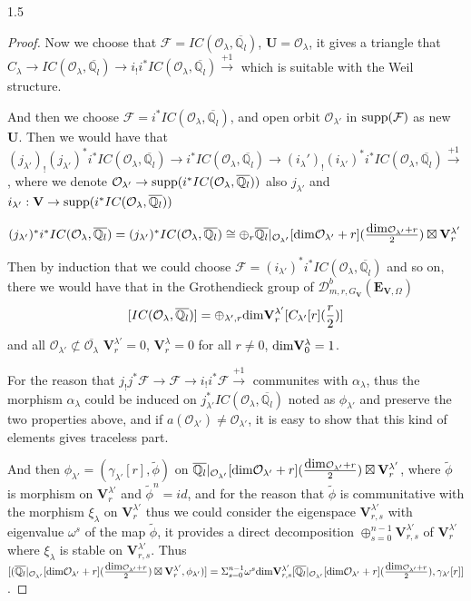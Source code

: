 \documentclass[10pt]{amsart}
\def\dim{\mbox{\rm dim}}   \def\End{\mbox{\rm End}}
\def\bfV{{\mathbf V}}
\def\supp{{\rm supp}}
\def\bfV{\mathbf{V}}
\def\bfE{\mathbf{E}}
\def\bfU{\mathbf{U}}
\newcommand\bbq{{\mathbb Q}}
\newcommand\mf{{\mathcal{F}}}
\newcommand\mo{{\mathcal{O}}}
\begin{document}
\begin{spacing}{1.5}
\begin{proof}
Now we choose that $\mf=IC(\mo_{\lambda},\overline{\bbq_l})$, $\bfU=\mo_{\lambda}$, it gives a triangle that $C_{\lambda}\rightarrow IC(\mo_{\lambda},\overline{\bbq_l})\rightarrow i_!i^*IC(\mo_{\lambda},\overline{\bbq_l})\xrightarrow{+1}$ which is suitable with the Weil structure.

And then we choose $\mf=i^*IC(\mo_{\lambda},\overline{\bbq_l})$, and open orbit $\mo_{\lambda'}$ in $\supp(\mf)$ as new $\bfU$. Then we would have that $(j_{\lambda'})_!(j_{\lambda'})^*i^*IC(\mo_{\lambda},\overline{\bbq_l})\rightarrow i^*IC(\mo_{\lambda},\overline{\bbq_l})\rightarrow (i_\lambda')_!(i_{\lambda'})^*i^*IC(\mo_{\lambda},\overline{\bbq_l})\xrightarrow{+1}$, where we denote $\mo_{\lambda'}\rightarrow \supp(i^*IC(\mo_{\lambda},\overline{\bbq_l}))$ also $j_{\lambda'}$ and $i_{\lambda'}:\bfV\rightarrow \supp(i^*IC(\mo_{\lambda},\overline{\bbq_l}))$

$(j_{\lambda'})^*i^*IC(\mo_{\lambda},\overline{\bbq_l})=(j_{\lambda'})^*IC(\mo_{\lambda},\overline{\bbq_l})\cong \oplus_r \overline{\bbq_{l}}|_{\mo_{\lambda'}}[\dim \mo_{\lambda'}+r](\frac{\dim \mo_{\lambda'}+r}{2})\boxtimes \bfV^{\lambda'}_r$

Then by induction that we could choose $\mf=(i_{\lambda'})^*i^*IC(\mo_{\lambda},\overline{\bbq_l})$ and so on, there we would have that in the Grothendieck group of $\mathcal{D}^{b}_{m,r,G_{\bfV}}(\bfE_{\bfV,\Omega})$  
$$[IC(\mo_{\lambda},\overline{\bbq_l})]=\oplus_{\lambda',r} \dim \bfV^{\lambda'}_r[C_{\lambda'}[r](\frac{r}{2})]$$ and all $\mo_{\lambda'}\not\subset \overline{\mo_{\lambda}}$ $\bfV^{\lambda'}_r=0$, $\bfV^{\lambda}_r=0$ for all $r\not=0$, $\dim \bfV_0^{\lambda}=1$.


For the reason that $j_!j^*\mf\rightarrow \mf \rightarrow i_!i^*\mf\xrightarrow{+1}$ communites with $\alpha_{\lambda}$, thus the morphism $\alpha_{\lambda}$ could be induced on $j_{\lambda'}^*IC(\mo_{\lambda},\overline{\bbq_l})$ noted as $\phi_{\lambda'}$ and preserve the two properties above, and if $a(\mo_{\lambda'})\not=\mo_{\lambda'}$, it is easy to show that this kind of elements gives traceless part.

And then $\phi_{\lambda'}=(\gamma_{\lambda'}[r],\tilde{\phi})$ on $\overline{\bbq_{l}}|_{\mo_{\lambda'}}[\dim \mo_{\lambda'}+r](\frac{\dim \mo_{\lambda'}+r}{2})\boxtimes \bfV^{\lambda'}_r$, where $\tilde{\phi}$ is morphism on $\bfV^{\lambda'}_{r}$ and $\tilde{\phi}^n=id$, and for the reason that $\tilde{\phi}$ is communitative with the morphism $\xi_{\lambda}$ on $\bfV^{\lambda'}_{r}$ thus we could consider the eigenspace $\bfV^{\lambda'}_{r,s}$ with eigenvalue $\omega^s$ of the map $\tilde{\phi}$, it provides a direct decomposition $\oplus_{s=0}^{n-1}\bfV^{\lambda'}_{r,s}$ of $\bfV^{\lambda'}_{r}$ where $\xi_{\lambda}$ is stable on $\bfV^{\lambda'}_{r,s}$. Thus $[(\overline{\bbq_{l}}|_{\mo_{\lambda'}}[\dim \mo_{\lambda'}+r](\frac{\dim \mo_{\lambda'}+r}{2})\boxtimes \bfV^{\lambda'}_r,\phi_{\lambda'})]=\Sigma_{s=0}^{n-1}\omega^s \dim \bfV^{\lambda'}_{r,s} [\overline{\bbq_{l}}|_{\mo_{\lambda'}}[\dim \mo_{\lambda'}+r](\frac{\dim \mo_{\lambda'}+r}{2}),\gamma_{\lambda'}[r]]$.


\end{proof}
\end{spacing}
\end{document}
